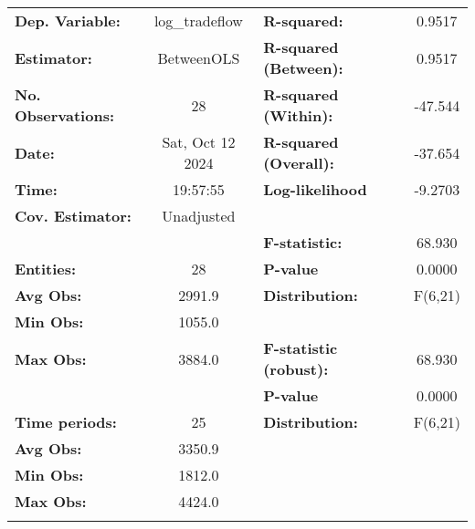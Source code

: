 \documentclass{article}
\begin{document}
\begin{center}
\begin{tabular}{lclc}
\toprule
\textbf{Dep. Variable:}    &   log\_tradeflow   & \textbf{  R-squared:         }   &      0.9517      \\
\textbf{Estimator:}        &     BetweenOLS     & \textbf{  R-squared (Between):}  &      0.9517      \\
\textbf{No. Observations:} &         28         & \textbf{  R-squared (Within):}   &     -47.544      \\
\textbf{Date:}             &  Sat, Oct 12 2024  & \textbf{  R-squared (Overall):}  &     -37.654      \\
\textbf{Time:}             &      19:57:55      & \textbf{  Log-likelihood     }   &     -9.2703      \\
\textbf{Cov. Estimator:}   &     Unadjusted     & \textbf{                     }   &                  \\
\textbf{}                  &                    & \textbf{  F-statistic:       }   &      68.930      \\
\textbf{Entities:}         &         28         & \textbf{  P-value            }   &      0.0000      \\
\textbf{Avg Obs:}          &       2991.9       & \textbf{  Distribution:      }   &     F(6,21)      \\
\textbf{Min Obs:}          &       1055.0       & \textbf{                     }   &                  \\
\textbf{Max Obs:}          &       3884.0       & \textbf{  F-statistic (robust):} &      68.930      \\
\textbf{}                  &                    & \textbf{  P-value            }   &      0.0000      \\
\textbf{Time periods:}     &         25         & \textbf{  Distribution:      }   &     F(6,21)      \\
\textbf{Avg Obs:}          &       3350.9       & \textbf{                     }   &                  \\
\textbf{Min Obs:}          &       1812.0       & \textbf{                     }   &                  \\
\textbf{Max Obs:}          &       4424.0       & \textbf{                     }   &                  \\
\textbf{}                  &                    & \textbf{                     }   &                  \\
\bottomrule

\end{tabular}
\end{center}
\end{document}
